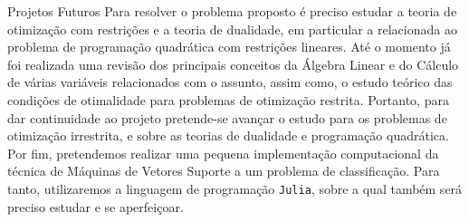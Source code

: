 \documentclass{beamer}
\theoremstyle{definition}%
\begin{document}

\begin{frame}{Projetos Futuros}
Para resolver o problema proposto é preciso estudar a teoria de otimização com restrições e a teoria de dualidade, em particular a relacionada ao problema de programação quadrática com restrições lineares. Até o momento já foi realizada uma revisão dos principais conceitos da Álgebra Linear e do Cálculo de várias variáveis relacionados com o assunto, assim como, o estudo teórico das condições de otimalidade para problemas de otimização restrita. Portanto, para dar continuidade ao projeto pretende-se avançar o estudo para os problemas de otimização irrestrita, e sobre as teorias de dualidade e programação quadrática. Por fim, pretendemos realizar uma pequena implementação computacional da técnica de Máquinas de Vetores Suporte a um problema de classificação. Para tanto, utilizaremos a linguagem de programação \texttt{Julia}, sobre a qual também será preciso estudar e se aperfeiçoar.
\end{frame}

\begin{frame}
\printbibliography
\end{frame}
\end{document}
